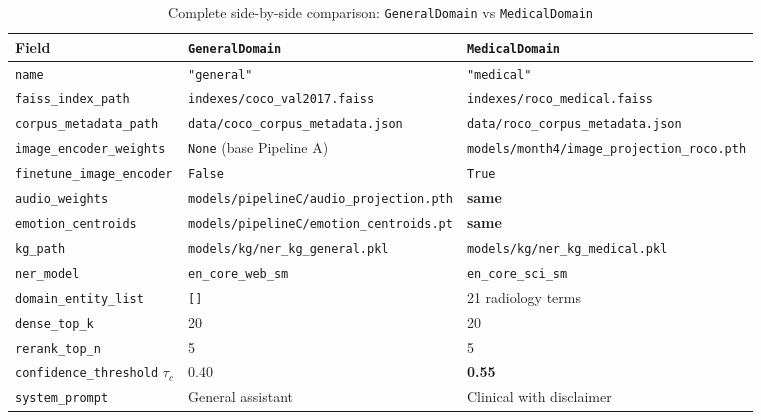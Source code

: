 \documentclass[12pt,a4paper]{article}
\theoremstyle{definition}
\theoremstyle{remark}
\begin{document}
\begin{table}[H]
\centering
\caption{Complete side-by-side comparison: \texttt{GeneralDomain} vs \texttt{MedicalDomain}}
\begin{tabularx}{\textwidth}{lXX}
\toprule
Field & \texttt{GeneralDomain} & \texttt{MedicalDomain} \\
\midrule
\texttt{name} & \texttt{"general"} & \texttt{"medical"} \\
\texttt{faiss\_index\_path} & \texttt{indexes/coco\_val2017.faiss} & \texttt{indexes/roco\_medical.faiss} \\
\texttt{corpus\_metadata\_path} & \texttt{data/coco\_corpus\_metadata.json} & \texttt{data/roco\_corpus\_metadata.json} \\
\texttt{image\_encoder\_weights} & \texttt{None} (base Pipeline A) & \texttt{models/month4/image\_projection\_roco.pth} \\
\texttt{finetune\_image\_encoder} & \texttt{False} & \texttt{True} \\
\texttt{audio\_weights} & \texttt{models/pipelineC/audio\_projection.pth} & \textbf{same} \\
\texttt{emotion\_centroids} & \texttt{models/pipelineC/emotion\_centroids.pt} & \textbf{same} \\
\texttt{kg\_path} & \texttt{models/kg/ner\_kg\_general.pkl} & \texttt{models/kg/ner\_kg\_medical.pkl} \\
\texttt{ner\_model} & \texttt{en\_core\_web\_sm} & \texttt{en\_core\_sci\_sm} \\
\texttt{domain\_entity\_list} & \texttt{[]} & 21 radiology terms \\
\texttt{dense\_top\_k} & 20 & 20 \\
\texttt{rerank\_top\_n} & 5 & 5 \\
\texttt{confidence\_threshold} $\tau_c$ & 0.40 & \textbf{0.55} \\
\texttt{system\_prompt} & General assistant & Clinical with disclaimer \\
\bottomrule
\end{tabularx}
\end{table}
\end{document}
